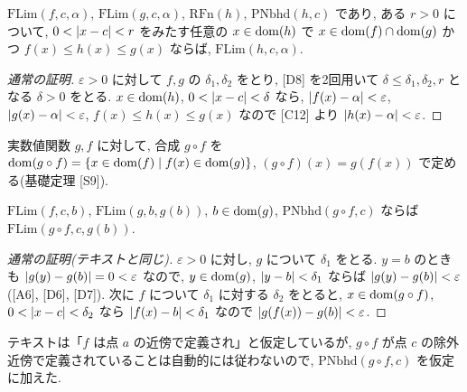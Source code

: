 \begin{thm}\label{thm:fsqueeze}
  $\mathrm{FLim}(f, c, \alpha)$, $\mathrm{FLim}(g, c, \alpha)$, $\mathrm{RFn}(h)$, $\mathrm{PNbhd}(h, c)$ であり, ある $r > 0$ について, $0 < \lvert x - c\rvert < r$ をみたす任意の $x \in \mathrm{dom}(h)$ で $x \in \mathrm{dom}(f) \cap \mathrm{dom}(g)$ かつ $f(x) \leq h(x) \leq g(x)$ ならば, $\mathrm{FLim}(h, c, \alpha)$.
\end{thm}
\begin{proof}[通常の証明]
  $\varepsilon > 0$ に対して $f, g$ の $\delta_1, \delta_2$ をとり, [D8] を2回用いて $\delta \leq \delta_1, \delta_2, r$ となる $\delta > 0$ をとる. $x \in \mathrm{dom}(h)$, $0 < \lvert x - c\rvert < \delta$ なら, $\lvert f(x) - \alpha\rvert < \varepsilon$, $\lvert g(x) - \alpha\rvert < \varepsilon$, $f(x) \leq h(x) \leq g(x)$ なので [C12] より $\lvert h(x) - \alpha\rvert < \varepsilon$.
\end{proof}

実数値関数 $g, f$ に対して, 合成 $g \circ f$ を $\mathrm{dom}(g \circ f) = \{x \in \mathrm{dom}(f) \mid f(x) \in \mathrm{dom}(g)\}$, $(g \circ f)(x) = g(f(x))$ で定める(基礎定理 [S9]).

\begin{thm}\label{thm:flim-comp}
  $\mathrm{FLim}(f, c, b)$, $\mathrm{FLim}(g, b, g(b))$, $b \in \mathrm{dom}(g)$, $\mathrm{PNbhd}(g \circ f, c)$ ならば $\mathrm{FLim}(g \circ f, c, g(b))$.
\end{thm}
\begin{proof}[通常の証明(テキストと同じ)]
  $\varepsilon > 0$ に対し, $g$ について $\delta_1$ をとる. $y = b$ のときも $\lvert g(y) - g(b)\rvert = 0 < \varepsilon$ なので, $y \in \mathrm{dom}(g)$, $\lvert y - b\rvert < \delta_1$ ならば $\lvert g(y) - g(b)\rvert < \varepsilon$ ([A6], [D6], [D7]). 次に $f$ について $\delta_1$ に対する $\delta_2$ をとると, $x \in \mathrm{dom}(g \circ f)$, $0 < \lvert x - c\rvert < \delta_2$ なら $\lvert f(x) - b\rvert < \delta_1$ なので $\lvert g(f(x)) - g(b)\rvert < \varepsilon$.
\end{proof}

テキストは「$f$ は点 $a$ の近傍で定義され」と仮定しているが, $g \circ f$ が点 $c$ の除外近傍で定義されていることは自動的には従わないので, $\mathrm{PNbhd}(g \circ f, c)$ を仮定に加えた.

